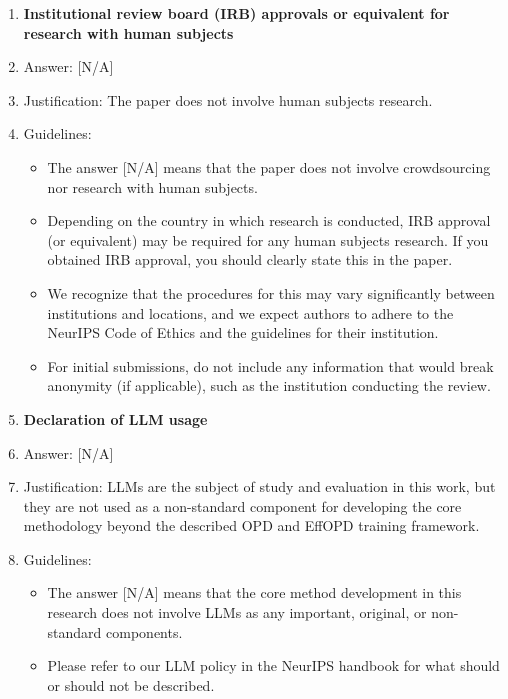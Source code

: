\documentclass{llmxive}
\providecommand{\answerNA}[1][]{[N/A]#1}
\begin{document}
\begin{enumerate}
\item {\bf Institutional review board (IRB) approvals or equivalent for research with human subjects}
    \item[] Answer: \answerNA{}
    \item[] Justification: The paper does not involve human subjects research.
    \item[] Guidelines:
    \begin{itemize}
        \item The answer \answerNA{} means that the paper does not involve crowdsourcing nor research with human subjects.
        \item Depending on the country in which research is conducted, IRB approval (or equivalent) may be required for any human subjects research. If you obtained IRB approval, you should clearly state this in the paper. 
        \item We recognize that the procedures for this may vary significantly between institutions and locations, and we expect authors to adhere to the NeurIPS Code of Ethics and the guidelines for their institution. 
        \item For initial submissions, do not include any information that would break anonymity (if applicable), such as the institution conducting the review.
    \end{itemize}
\item {\bf Declaration of LLM usage}
    \item[] Answer: \answerNA{}
    \item[] Justification: LLMs are the subject of study and evaluation in this work, but they are not used as a non-standard component for developing the core methodology beyond the described OPD and EffOPD training framework.
    \item[] Guidelines:
    \begin{itemize}
        \item The answer \answerNA{} means that the core method development in this research does not involve LLMs as any important, original, or non-standard components.
        \item Please refer to our LLM policy in the NeurIPS handbook for what should or should not be described.
    \end{itemize}
\end{enumerate}
\end{document}
